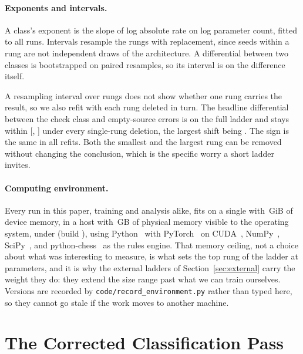 \documentclass[11pt]{article}
\begin{document}
\paragraph{Exponents and intervals.}
A class's exponent is the slope of log absolute rate on log parameter count,
fitted to all runs. Intervals resample the  rungs with
replacement, since seeds within a rung are not independent draws of the
architecture. A differential between two classes is bootstrapped on paired
resamples, so its interval is on the difference itself.

A resampling interval over  rungs does not show whether one rung carries the
result, so we also refit with each rung deleted in turn. The headline differential
between the check class and empty-source errors is  on the full ladder and
stays within [, ] under every single-rung deletion, the largest shift
being . The sign is the same in all  refits. Both the smallest and the
largest rung can be removed without changing the conclusion, which is the specific
worry a short ladder invites.

\paragraph{Computing environment.}
Every run in this paper, training and analysis alike, fits on a single
 with \,GiB of device memory, in a host with
\,GB of physical memory visible to the operating system, under
 (build ),
using Python~ with PyTorch~ on
CUDA~, NumPy~, SciPy~, and
python-chess~ as the rules engine. That memory ceiling, not a
choice about what was interesting to measure, is what sets the top rung of the
ladder at  parameters, and it is why the external ladders of
Section~\ref{sec:external} carry the weight they do: they extend the size range
past what we can train ourselves. Versions are recorded by
\texttt{code/record\_environment.py} rather than typed here, so they cannot go
stale if the work moves to another machine.


\section{The Corrected Classification Pass}
\label{sec:regen}
\end{document}
